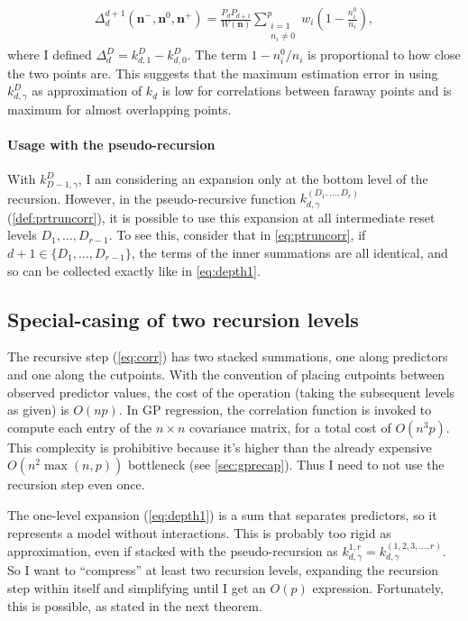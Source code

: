 \documentclass[a4paper]{article}
\newcommand{\nvecs}{\mathbf n^-, \mathbf n^0, \mathbf n^+}
\theoremstyle{definition}
\begin{document}
    \begin{align}
        \Delta_d^{d+1}(\nvecs) = \frac{P_d P_{d+1}}{W(\mathbf n)}
        \sum_{\substack{i=1 \\ n_i \ne 0}}^p
        w_i \left( 1 - \frac{n^0_i}{n_i} \right),
    \end{align}
    where I defined $\Delta_d^D = k^D_{d,1} - k^D_{d,0}$. The term $1 - n^0_i/n_i$ is proportional to how close the two points are. This suggests that the maximum estimation error in using $k^D_{d,\gamma}$ as approximation of $k_d$ is low for correlations between faraway points and is maximum for almost overlapping points.

    \paragraph{Usage with the pseudo-recursion}

    With $k^D_{D-1,\gamma}$, I am considering an expansion only at the bottom level of the recursion. However, in the pseudo-recursive function $k^{(D_1,\ldots,D_r)}_{d,\gamma}$ (\autoref{def:prtruncorr}), it is possible to use this expansion at all intermediate reset levels $D_1,\ldots,D_{r-1}$. To see this, consider that in \autoref{eq:ptruncorr}, if $d+1 \in \{D_1,\ldots,D_{r-1}\}$, the terms of the inner summations are all identical, and so can be collected exactly like in \autoref{eq:depth1}.

    \subsection{Special-casing of two recursion levels}
    \label{sec:special2}

    The recursive step (\autoref{eq:corr}) has two stacked summations, one along predictors and one along the cutpoints. With the convention of placing cutpoints between observed predictor values, the cost of the operation (taking the subsequent levels as given) is $O(np)$. In GP regression, the correlation function is invoked to compute each entry of the $n\times n$ covariance matrix, for a total cost of $O(n^3p)$. This complexity is prohibitive because it's higher than the already expensive $O(n^2\max(n,p))$ bottleneck (see \autoref{sec:gprecap}). Thus I need to not use the recursion step even once.

    The one-level expansion (\autoref{eq:depth1}) is a sum that separates predictors, so it represents a model without interactions. This is probably too rigid as approximation, even if stacked with the pseudo-recursion as $k^{1,r}_{d,\gamma} = k^{(1,2,3,\ldots,r)}_{d,\gamma}$. So I want to ``compress'' at least two recursion levels, expanding the recursion step within itself and simplifying until I get an $O(p)$ expression. Fortunately, this is possible, as stated in the next theorem.
\end{document}
